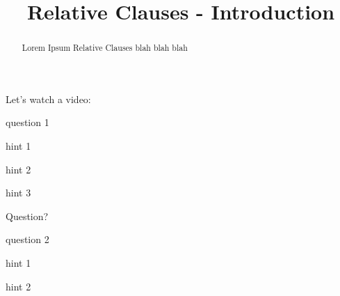 \documentclass{ximera}
\title{Relative Clauses - Introduction}
\begin{document}
\begin{abstract}
Lorem Ipsum Relative Clauses blah blah blah
\end{abstract}
\maketitle

\begin{question}
Let's watch a video:

question 1
\begin{solution}
\begin{hint}
hint 1
\end{hint}
\begin{hint}
hint 2
\end{hint}
\begin{hint}
hint 3
\end{hint}
Question?
\end{solution}
\end{question}

\begin{question}
question 2
\begin{solution}
\begin{multiple-choice}
\end{multiple-choice}
\begin{hint}
hint 1
\end{hint}
\begin{hint}
hint 2
\end{hint}
\end{solution}
\end{question}
\end{document}
